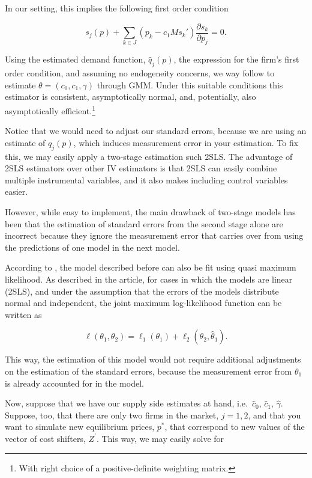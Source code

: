 \documentclass[cm,linguex]{glossa}
\theoremstyle{defn}
\theoremstyle{axiom}
\theoremstyle{thm}
\theoremstyle{lem}
\theoremstyle{cor}
\theoremstyle{prop}
\theoremstyle{rmk}
\begin{document}
In our setting, this implies the following first order condition

\[ s_j(p) + \sum_{k \in J} (p_k - c_1 M s_k') \frac{\partial s_k}{\partial p_j} = 0. \]

Using the estimated demand function, \(\hat q_j(p)\), the expression for
the firm's first order condition, and assuming no endogeneity concerns,
we way follow \citet{hackmann} to estimate
\(\theta = (c_0, c_1, \gamma)\) through GMM. Under this suitable
conditions this estimator is consistent, asymptotically normal, and,
potentially, also asymptotically efficient.\footnote{With right choice
  of a positive-definite weighting matrix.}

Notice that we would need to adjust our standard errors, because we are
using an estimate of \(q_j(p)\), which induces measurement error in your
estimation. To fix this, we may easily apply a two-stage estimation such
2SLS. The advantage of 2SLS estimators over other IV estimators is that
2SLS can easily combine multiple instrumental variables, and it also
makes including control variables easier.

However, while easy to implement, the main drawback of two-stage models
has been that the estimation of standard errors from the second stage
alone are incorrect because they ignore the measurement error that
carries over from using the predictions of one model in the next model.

According to \citet{quasi}, the model described before can also be fit
using quasi maximum likelihood. As described in the article, for cases
in which the models are linear (2SLS), and under the assumption that the
errors of the models distribute normal and independent, the joint
maximum log-likelihood function can be written as

\[ \ell(\theta_1, \theta_2) = \ell_1(\theta_1) + \ell_2(\theta_2, \hat{\theta}_1). \]

This way, the estimation of this model would not require additional
adjustments on the estimation of the standard errors, because the
measurement error from \(\theta_1\) is already accounted for in the
model.

Now, suppose that we have our supply side estimates at hand,
i.e.~\(\hat c_0\), \(\hat c_1\), \(\hat\gamma\). Suppose, too, that
there are only two firms in the market, \(j = 1, 2\), and that you want
to simulate new equilibrium prices, \(p^*\), that correspond to new
values of the vector of cost shifters, \(Z^\prime\). This way, we may
easily solve for
\end{document}
